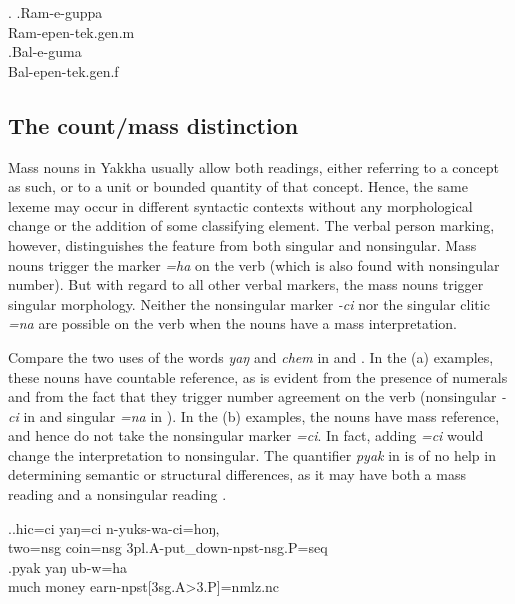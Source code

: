 \ex. \ag.Ram-e-guppa\\
		 Ram{\sc -epen-tek.gen.m}\\
 	\bg.Bal-e-guma\\
		Bal{\sc -epen-tek.gen.f}\\
	
\subsection{The count/mass distinction}\label{lex-noun-4}

Mass nouns in Yakkha usually allow both readings, either referring to a concept as such, or to a unit or bounded quantity of that concept. Hence, the same lexeme may occur in different syntactic contexts without any morphological change or the addition of some classifying element. The verbal person marking, however, distinguishes the feature  from both singular and nonsingular. Mass nouns trigger the marker \emph{=ha} on the verb (which is also found with nonsingular number). But with regard to all other verbal markers, the mass nouns trigger singular morphology. Neither  the nonsingular marker \emph{-ci} nor the singular clitic \emph{=na} are possible on the verb when the nouns have a mass interpretation. 

Compare the two uses of the words \emph{yaŋ}   and \emph{chem}  in \Next and \NNext. In the (a) examples, these nouns have countable reference, as is evident from the presence of numerals and from the fact that they trigger number agreement on the verb (nonsingular \emph{-ci} in \Next[a] and singular \emph{=na} in \NNext[a]). In the (b) examples, the nouns have mass reference, and hence do not take the nonsingular marker \emph{=ci}.  In fact, adding \emph{=ci} would change the interpretation to nonsingular. The quantifier \emph{pyak} in \Next[b] is of no help in determining semantic or structural differences, as it may have both a mass reading  and a nonsingular reading .

\ex.\ag.hic=ci yaŋ=ci     n-yuks-wa-ci=hoŋ, \\
two{\sc =nsg} coin{\sc =nsg} {\sc 3pl.A-}put\_down{\sc -npst-nsg.P=seq}\\
  
\bg.pyak yaŋ ub-w=ha\\
much money earn{\sc -npst[3sg.A>3.P]=nmlz.nc}\\


